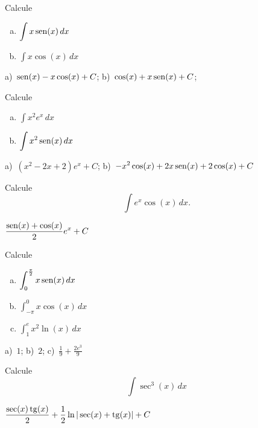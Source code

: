 \begin{exer}
  Calcule
  \begin{enumerate}[a)]
  \item $\displaystyle \int x\operatorname{sen}(x)\,dx$
  \item $\displaystyle \int x\cos(x)\,dx$
  \end{enumerate}
\end{exer}
\begin{resp}
  a)~$\displaystyle \operatorname{sen}(x)-x\cos(x)+C$; b)~$\displaystyle \cos(x)+x\operatorname{sen}(x)+C$;
\end{resp}

\begin{exer}
  Calcule
  \begin{enumerate}[a)]
  \item $\displaystyle \int x^2e^x\,dx$
  \item $\displaystyle \int x^2\operatorname{sen}(x)\,dx$
  \end{enumerate}
\end{exer}
\begin{resp}
  a)~$\displaystyle \left(x^2-2x+2\right)e^x+C$; b)~$\displaystyle -x^2\cos(x)+2x\operatorname{sen}(x)+2\cos(x)+C$
\end{resp}

\begin{exer}
  Calcule
  \begin{equation}
    \int e^x\cos(x)\,dx.
  \end{equation}
\end{exer}
\begin{resp}
  $\displaystyle \frac{\operatorname{sen}(x)+\cos(x)}{2}e^x + C$
\end{resp}

\begin{exer}
  Calcule
  \begin{enumerate}[a)]
  \item $\displaystyle \int_0^{\frac{\pi}{2}} x\operatorname{sen}(x)\,dx$
  \item $\displaystyle \int_{-\pi}^{0} x\cos(x)\,dx$
  \item $\displaystyle \int_1^e x^2\ln(x)\,dx$
  \end{enumerate}
\end{exer}
\begin{resp}
  a)~$1$; b)~$2$;  c)~$\displaystyle \frac{1}{9}+\frac{2e^3}{9}$
\end{resp}

\begin{exer}\label{eq:int_sec3_x}
  Calcule
  \begin{equation}
    \int \sec^3(x)\,dx
  \end{equation}
\end{exer}
\begin{resp}
  $\displaystyle\frac{\sec(x)\operatorname{tg}(x)}{2} + \frac{1}{2}\ln|\sec(x)+\operatorname{tg}(x)| + C$
\end{resp}

